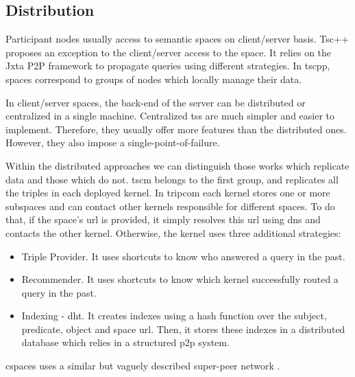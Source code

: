 



\subsection{Distribution} %
\label{sec:soa_tsc_distribution}

\begin{sloppypar}
Participant nodes usually access to semantic spaces on client/server basis.
Tsc++\citep{krummenacher_open_2009,blunder_distributed_2009} proposes an exception to the client/server access to the space.
It relies on the Jxta P2P framework  to propagate queries using different strategies.
In \acs{tscpp}, spaces correspond to groups of nodes which locally manage their data.
\end{sloppypar}


In client/server spaces, the back-end of the server can be distributed or centralized in a single machine.
Centralized \aclp{ts} are much simpler and easier to implement.
Therefore, they usually offer more features than the distributed ones.
However, they also impose a single-point-of-failure.


Within the distributed approaches we can distinguish those works which replicate data and those which do not.
\acs{tscm} belongs to the first group, and replicates all the triples in each deployed kernel.
In \ac{tripcom} each kernel stores one or more subspaces and can contact other kernels responsible for different spaces.
To do that, if the space's \ac{url} is provided, it simply resolves this \ac{url} using \ac{dns} and contacts the other kernel.
Otherwise, the kernel uses three additional strategies:
\begin{itemize}
  \item Triple Provider.
	It uses shortcuts to know who answered a query in the past.
  \item Recommender.
	It uses shortcuts to know which kernel successfully routed a query in the past.
  \item Indexing - \ac{dht}.
	It creates indexes using a hash function over the subject, predicate, object and space \ac{url}.
	Then, it stores these indexes in a distributed database which relies in a structured \ac{p2p} system. %
\end{itemize}
\ac{cspaces} uses a similar but vaguely described super-peer network \citep{martinrecuerda_application_2006}.


